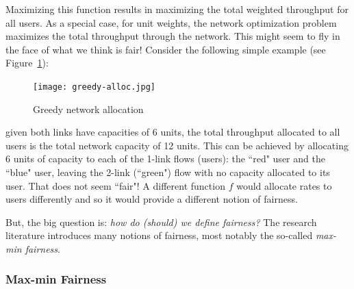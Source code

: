 \documentclass{article}
\begin{document}
Maximizing this function results in maximizing the total weighted throughput for all users. As a special case, for unit weights, the network optimization problem maximizes the total throughput through the network. This might seem to fly in the face of what we think is fair! Consider the following simple example (see Figure~\ref{fig:greedy-alloc}):
\begin{figure}[htbp] %
   \centering
   \texttt{[image: greedy-alloc.jpg]} 
   \caption{Greedy network allocation}
   \label{fig:greedy-alloc}
\end{figure}
given both links have capacities of 6 units, the total throughput allocated to all users is the total network capacity of 12 units. This can be achieved by allocating 6 units of capacity to each of the 1-link flows (users): the ``red" user and the ``blue" user, leaving the 2-link (``green") flow with no capacity allocated to its user. That does not seem ``fair"! A different function $f$ would allocate rates to users differently and so it would provide a different notion of fairness.

But, the big question is: {\em how do (should) we define fairness?} The research literature introduces many notions of fairness, most notably the so-called {\em max-min fairness}.

\subsubsection{Max-min Fairness}
\end{document}

